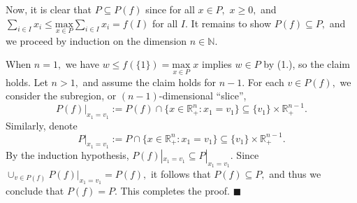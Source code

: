 \documentclass{article}
\let\emptyset\varnothing
\let\epsilon\varepsilon
\newcommand{\R}{\mathbb{R}}
\begin{document}
  Now, it is clear that $P\subseteq P(f)$ since for all $x\in P,$ $x\geq 0,$ and $\sum_{i\in I}x_i\leq \underset{x\in P}{\text{max}} \sum_{i\in I}x_i=f(I)$ for all $I.$ It remains to show $P(f)\subseteq P,$ and we proceed by induction on the dimension $n\in \mathbb{N}$.

  When $n=1,$ we have $w\leq f(\{1\})=\underset{x\in P}{\text{max}}\; x$ implies $w\in P$ by (1.), so the claim holds. Let $n>1,$ and assume the claim holds for $n-1.$ For each $v\in P(f),$ we consider the subregion, or $(n-1)$-dimensional ``slice'', $$P(f)|_{x_1=v_1}:=P(f)\cap \{x\in\mathbb{R}^n_+:x_1=v_1\}\subseteq \{v_1\}\times \mathbb{R}^{n-1}_+.$$Similarly, denote $$P|_{x_1=v_1}:=P\cap \{x\in\mathbb{R}^n_+:x_1=v_1\}\subseteq \{v_1\}\times \mathbb{R}^{n-1}_+.$$By the induction hypothesis, $P(f)|_{x_1=v_1}\subseteq P|_{x_1=v_1}.$ Since $\cup_{v\in P(f)} P(f)|_{x_1=v_1} =P(f),$ it follows that $P(f)\subseteq P,$ and thus we conclude that $P(f)=P.$ This completes the proof. $\blacksquare$



\end{document}
